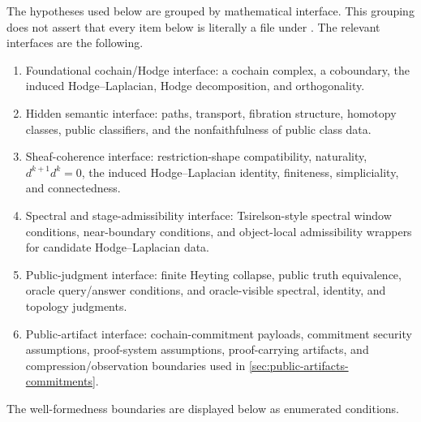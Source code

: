 The hypotheses used below are grouped by mathematical interface. This grouping
does not assert that every item below is literally a file under .
The relevant interfaces are the following.
\begin{enumerate}[label=(\roman*)]
  \item Foundational cochain/Hodge interface: a cochain complex, a coboundary,
  the induced Hodge--Laplacian, Hodge decomposition, and orthogonality.
  \item Hidden semantic interface: paths, transport, fibration structure,
  homotopy classes, public classifiers, and the nonfaithfulness of public
  class data.
  \item Sheaf-coherence interface: restriction-shape compatibility, naturality,
  \(d^{k+1}d^k=0\), the induced Hodge--Laplacian identity, finiteness,
  simpliciality, and connectedness.
  \item Spectral and stage-admissibility interface: Tsirelson-style spectral
  window conditions, near-boundary conditions, and object-local admissibility
  wrappers for candidate Hodge--Laplacian data.
  \item Public-judgment interface: finite Heyting collapse, public truth
  equivalence, oracle query/answer conditions, and oracle-visible spectral,
  identity, and topology judgments.
  \item Public-artifact interface: cochain-commitment payloads, commitment
  security assumptions, proof-system assumptions, proof-carrying artifacts, and
  compression/observation boundaries used in \cref{sec:public-artifacts-commitments}.
\end{enumerate}
The well-formedness boundaries are displayed below as enumerated conditions.

